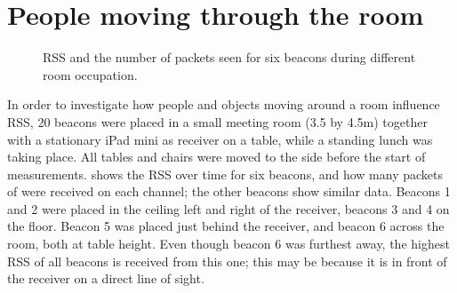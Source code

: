 \section{People moving through the room}
\label{sec:rss-busyroom}
\begin{figure}[p]
    \begin{subfigure}[b]{0.5\textwidth}
    \end{subfigure}
    \begin{subfigure}[b]{0.5\textwidth}
    \end{subfigure}
    \begin{subfigure}[b]{0.5\textwidth}
    \end{subfigure}
    \begin{subfigure}[b]{0.5\textwidth}
    \end{subfigure}
    \begin{subfigure}[b]{0.5\textwidth}
    \end{subfigure}
    \begin{subfigure}[b]{0.5\textwidth}
    \end{subfigure}
    \caption{RSS and the number of packets seen for six beacons during different room occupation.}
    \label{fig:rss-busyroom}
\end{figure}

In order to investigate how people and objects moving around a room influence RSS, 20 beacons were placed in a small meeting room (3.5 by 4.5m) together with a stationary iPad mini as receiver on a table, while a standing lunch was taking place.
All tables and chairs were moved to the side before the start of measurements.
 shows the RSS over time for six beacons, and how many packets of were received on each channel; the other beacons show similar data.
Beacons 1 and 2 were placed in the ceiling left and right of the receiver, beacons 3 and 4 on the floor.
Beacon 5 was placed just behind the receiver, and beacon 6 across the room, both at table height.
Even though beacon 6 was furthest away, the highest RSS of all beacons is received from this one; this may be because it is in front of the receiver on a direct line of sight.

